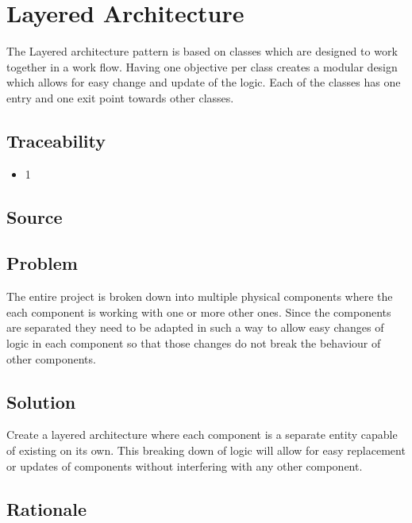 

\section{Layered Architecture}
	
	The Layered architecture pattern is based on classes which are designed to work together in a work flow. Having one objective per class creates a modular design which allows for easy change and update of the logic. Each of the classes has one entry and one exit point towards other classes. 
	
	\subsection{Traceability} 
		\begin{itemize}
			\item 1
		\end{itemize}

	\subsection{Source} \cite{book:design-patterns}

	\subsection{Problem}

	The entire project is broken down into multiple physical components where the each component is working with one or more other ones. Since the components are separated they need to be adapted in such a way to allow easy changes of logic in each component so that those changes do not break the behaviour of other components.

	\subsection{Solution} 

	Create a layered architecture where each component is a separate entity capable of existing on its own. This breaking down of logic will allow for easy replacement or updates of components without interfering with any other component. 

	\subsection{Rationale} \label{Layers:rationale}

